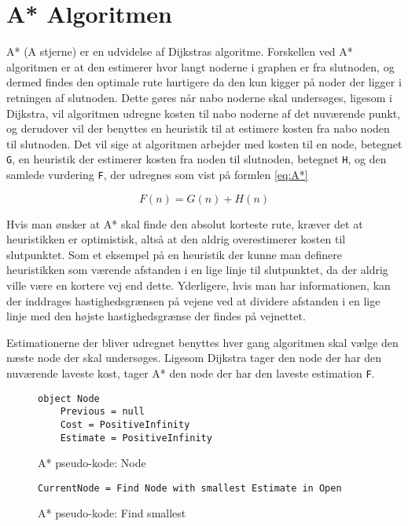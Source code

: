 \section{A* Algoritmen}
A* (A stjerne) er en udvidelse af Dijkstras algoritme. Forskellen ved A* algoritmen er at den estimerer hvor langt noderne i graphen er fra slutnoden, og dermed findes den optimale rute hurtigere da den kun kigger på noder der ligger i retningen af slutnoden. Dette gøres når nabo noderne skal undersøges, ligesom i Dijkstra, vil algoritmen udregne kosten til nabo noderne af det nuværende punkt, og derudover vil der benyttes en heuristik til at estimere kosten fra nabo noden til slutnoden. Det vil sige at algoritmen arbejder med kosten til en node, betegnet \texttt{G}, en heuristik der estimerer kosten fra noden til slutnoden, betegnet \texttt{H}, og den samlede vurdering \texttt{F}, der udregnes som vist på formlen \ref{eq:A*}

\begin{equation} \label{eq:A*}
F(n) = G(n) + H(n)
\end{equation}
\vspace{5mm}

Hvis man ønsker at A* skal finde den absolut korteste rute, kræver det at heuristikken er optimistisk, altså at den aldrig overestimerer kosten til slutpunktet. Som et eksempel på en heuristik der kunne man definere heuristikken som værende afstanden i en lige linje til slutpunktet, da der aldrig ville være en kortere vej end dette. Yderligere, hvis man har informationen, kan der inddrages hastighedsgrænsen på vejene ved at dividere afstanden i en lige linje med den højste hastighedsgrænse der findes på vejnettet.

\vspace{5mm}

Estimationerne der bliver udregnet benyttes hver gang algoritmen skal vælge den næste node der skal undersøges. Ligesom Dijkstra tager den node der har den nuværende laveste kost, tager A* den node der har den laveste estimation \texttt{F}.

\begin{figure}[H]
\begin{lstlisting}
object Node
	Previous = null
	Cost = PositiveInfinity
	Estimate = PositiveInfinity
\end{lstlisting}
\caption{A* pseudo-kode: Node}\label{AStarCodeNode}
\end{figure}

\begin{figure}[H]
\begin{lstlisting}
CurrentNode = Find Node with smallest Estimate in Open
\end{lstlisting}
\caption{A* pseudo-kode: Find smallest}\label{AStarCodeFindSmallest}
\end{figure}

